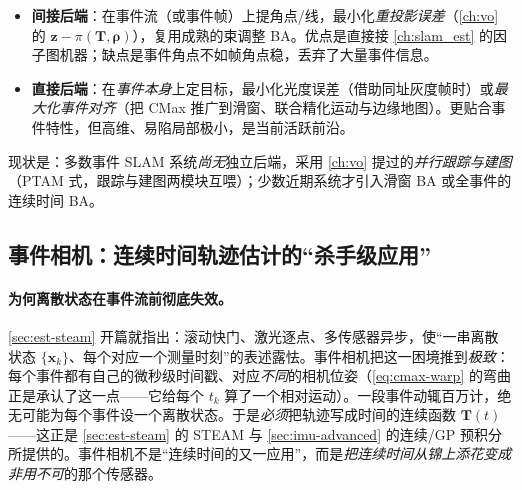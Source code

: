 \begin{itemize}
  \item \textbf{间接后端}：在事件流（或事件帧）上提角点/线，最小化\emph{重投影误差}（\cref{ch:vo} 的 $\mathbf z-\pi(\mathbf T,\boldsymbol\rho)$），复用成熟的束调整 BA。优点是直接接 \cref{ch:slam_est} 的因子图机器；缺点是事件角点不如帧角点稳，丢弃了大量事件信息。
  \item \textbf{直接后端}：在\emph{事件本身}上定目标，最小化光度误差（借助同址灰度帧时）或\emph{最大化事件对齐}（把 CMax 推广到滑窗、联合精化运动与边缘地图）。更贴合事件特性，但高维、易陷局部极小，是当前活跃前沿。
\end{itemize}
现状是：多数事件 SLAM 系统\emph{尚无}独立后端，采用 \cref{ch:vo} 提过的\emph{并行跟踪与建图}（PTAM 式，跟踪与建图两模块互喂\cite{rebecq2017evo,zhou2021esvo}）；少数近期系统才引入滑窗 BA\cite{vidal2018ultimate} 或全事件的连续时间 BA\cite{guo2024cmaxslam}。

\subsection{事件相机：连续时间轨迹估计的“杀手级应用”}
\label{sec:event-ct}

\paragraph{为何离散状态在事件流前彻底失效。}
\cref{sec:est-steam} 开篇就指出：滚动快门、激光逐点、多传感器异步，使“一串离散状态 $\{\mathbf x_k\}$、每个对应一个测量时刻”的表述露怯。事件相机把这一困境推到\emph{极致}\cite{gallego2022eventsurvey}：每个事件都有自己的微秒级时间戳、对应\emph{不同}的相机位姿（\cref{eq:cmax-warp} 的弯曲正是承认了这一点——它给每个 $t_k$ 算了一个相对运动）。一段事件动辄百万计，绝无可能为每个事件设一个离散状态。于是\emph{必须}把轨迹写成时间的连续函数 $\mathbf T(t)$——这正是 \cref{sec:est-steam} 的 STEAM 与 \cref{sec:imu-advanced} 的连续/GP 预积分所提供的。事件相机不是“连续时间的又一应用”，而是\emph{把连续时间从锦上添花变成非用不可}的那个传感器。

